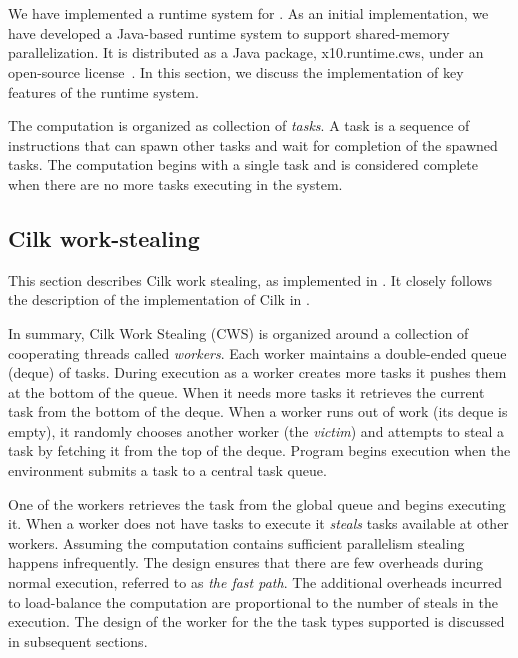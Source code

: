 \section{\XWS}
\label{s:runtime}

We have implemented a runtime system for \Xten{}. 
As an initial implementation, we have developed a Java-based
runtime system to support shared-memory parallelization. It is
distributed as a Java package, {\java x10.runtime.cws}, under an
open-source license~\cite{x10-webpage}. In this section, we discuss the
implementation of key features of the runtime system.

The computation is organized as collection of {\em tasks}. A task is a
sequence of instructions that can spawn other tasks and wait for
completion of the spawned tasks. The computation begins with a single
task and is considered complete when there are no more tasks executing
in the system. 

\subsection{Cilk work-stealing}
This section describes Cilk work stealing, as implemented in \XWS. It
closely follows the description of the implementation of Cilk in
\cite{frigo98implementation}.

In summary, Cilk Work Stealing (CWS) is organized around a collection
of cooperating threads called {\em workers}. Each worker maintains a
double-ended queue (deque) of tasks. During execution as a worker
creates more tasks it pushes them at the bottom of the queue. When it
needs more tasks it retrieves the current task from the bottom of the
deque. When a worker runs out of work (its deque is empty), it
randomly chooses another worker (the {\em victim}) and attempts to
steal a task by fetching it from the top of the deque. Program begins
execution when the environment submits a task to a central task queue.

One of the workers retrieves the task from the global queue and begins
executing it. When a worker does not have tasks to execute it {\em steals}
tasks available at other workers. Assuming the computation contains
sufficient parallelism stealing happens infrequently. The design
ensures that there are few overheads during normal execution, referred
to as {\em the fast path}. The additional overheads incurred to load-balance
the computation are proportional to the number of steals in the
execution. The design of the worker for the the task types supported
is discussed in subsequent sections.

